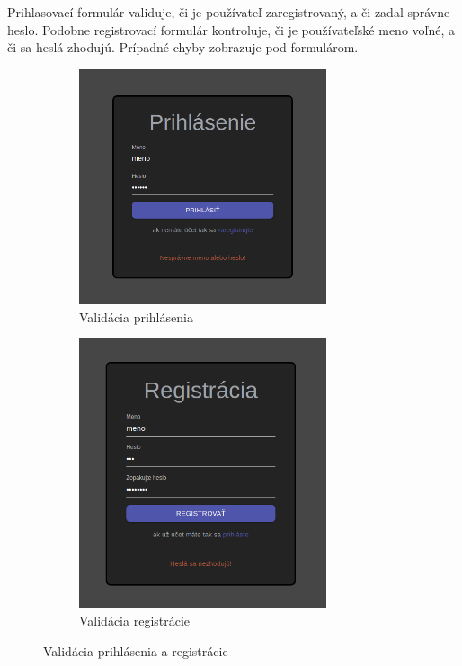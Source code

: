 Prihlasovací formulár validuje, či je používateľ zaregistrovaný, a či zadal správne heslo. Podobne
registrovací formulár kontroluje, či je používateľské meno voľné, a či sa heslá zhodujú. Prípadné
chyby zobrazuje pod formulárom.
\begin{figure}[H]
\centering
\begin{subfigure}{.5\textwidth}
  \centering
  \includegraphics[width=0.8\textwidth]{images/validacia_prihlasenie}
  \caption[Validácia prihlásenia]{Validácia prihlásenia}
  \label{obr:validacia_prihlasenie}
\end{subfigure}%
\begin{subfigure}{.5\textwidth}
  \centering
  \includegraphics[width=0.8\textwidth]{images/validacia_registracia}
  \caption[Validácia registrácie]{Validácia registrácie}
  \label{obr:validacia_registracia}
\end{subfigure}
\caption{Validácia prihlásenia a registrácie}
\end{figure}

